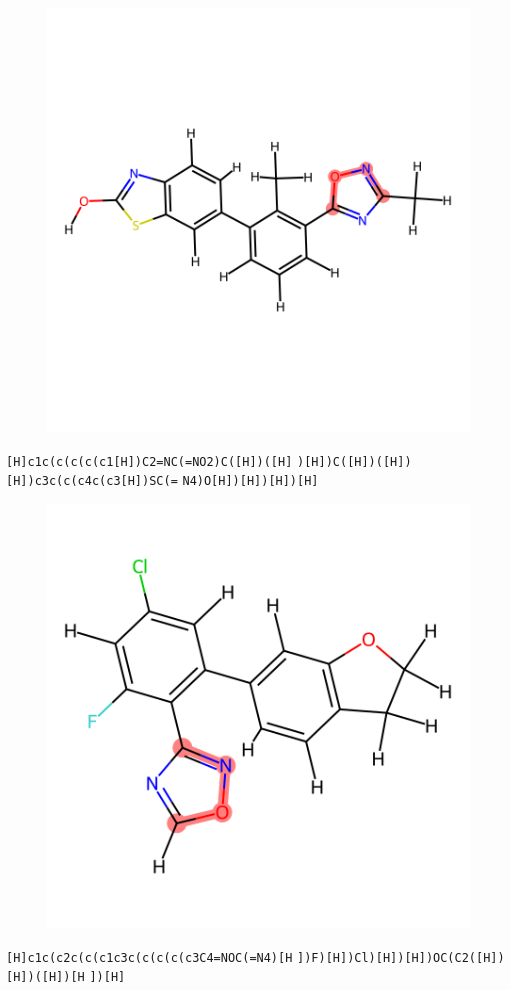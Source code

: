 \documentclass{article}
\begin{document}
\begin{figure}[ht]
\centering
    \includegraphics{mol280.png}
\end{figure}
\verb|[H]c1c(c(c(c(c1[H])C2=NC(=NO2)C([H])([H]| \verb|)[H])C([H])([H])[H])c3c(c(c4c(c3[H])SC(=| \verb|N4)O[H])[H])[H])[H]|

\begin{figure}[ht]
\centering
    \includegraphics{mol281.png}
\end{figure}
\verb|[H]c1c(c2c(c(c1c3c(c(c(c(c3C4=NOC(=N4)[H| \verb|])F)[H])Cl)[H])[H])OC(C2([H])[H])([H])[H| \verb|])[H]|
\end{document}
